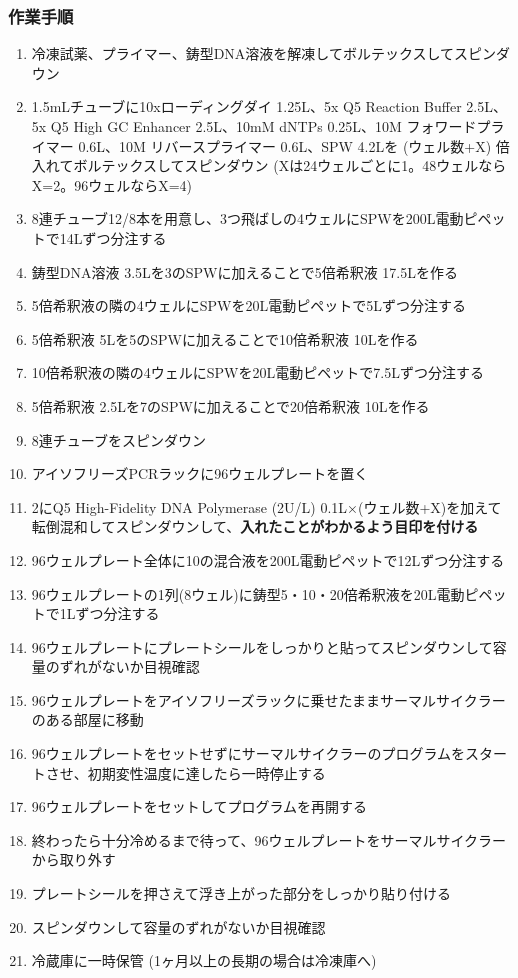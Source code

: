 \documentclass[titlepage,10pt,a4paper]{jsbook}
\begin{document}
\subsubsection{作業手順}
\begin{enumerate}
\item 冷凍試薬、プライマー、鋳型DNA溶液を解凍してボルテックスしてスピンダウン
\item 1.5mLチューブに10xローディングダイ 1.25{\textmu}L、5x Q5 Reaction Buffer 2.5{\textmu}L、5x Q5 High GC Enhancer 2.5{\textmu}L、10mM dNTPs 0.25{\textmu}L、10{\textmu}M フォワードプライマー 0.6{\textmu}L、10{\textmu}M リバースプライマー 0.6{\textmu}L、SPW 4.2{\textmu}Lを (ウェル数+X) 倍入れてボルテックスしてスピンダウン (Xは24ウェルごとに1。48ウェルならX=2。96ウェルならX=4)
\item 8連チューブ12/8本を用意し、3つ飛ばしの4ウェルにSPWを200{\textmu}L電動ピペットで14{\textmu}Lずつ分注する
\item 鋳型DNA溶液 3.5{\textmu}Lを3のSPWに加えることで5倍希釈液 17.5{\textmu}Lを作る
\item 5倍希釈液の隣の4ウェルにSPWを20{\textmu}L電動ピペットで5{\textmu}Lずつ分注する
\item 5倍希釈液 5{\textmu}Lを5のSPWに加えることで10倍希釈液 10{\textmu}Lを作る
\item 10倍希釈液の隣の4ウェルにSPWを20{\textmu}L電動ピペットで7.5{\textmu}Lずつ分注する
\item 5倍希釈液 2.5{\textmu}Lを7のSPWに加えることで20倍希釈液 10{\textmu}Lを作る
\item 8連チューブをスピンダウン
\item アイソフリーズPCRラックに96ウェルプレートを置く
\item 2にQ5 High-Fidelity DNA Polymerase (2U/{\textmu}L) 0.1{\textmu}L×(ウェル数+X)を加えて転倒混和してスピンダウンして、\textbf{入れたことがわかるよう目印を付ける}
\item 96ウェルプレート全体に10の混合液を200{\textmu}L電動ピペットで12{\textmu}Lずつ分注する
\item 96ウェルプレートの1列(8ウェル)に鋳型5・10・20倍希釈液を20{\textmu}L電動ピペットで1{\textmu}Lずつ分注する
\item 96ウェルプレートにプレートシールをしっかりと貼ってスピンダウンして容量のずれがないか目視確認
\item 96ウェルプレートをアイソフリーズラックに乗せたままサーマルサイクラーのある部屋に移動
\item 96ウェルプレートをセットせずにサーマルサイクラーのプログラムをスタートさせ、初期変性温度に達したら一時停止する
\item 96ウェルプレートをセットしてプログラムを再開する
\item 終わったら十分冷めるまで待って、96ウェルプレートをサーマルサイクラーから取り外す
\item プレートシールを押さえて浮き上がった部分をしっかり貼り付ける
\item スピンダウンして容量のずれがないか目視確認
\item 冷蔵庫に一時保管 (1ヶ月以上の長期の場合は冷凍庫へ)
\end{enumerate}
\end{document}

